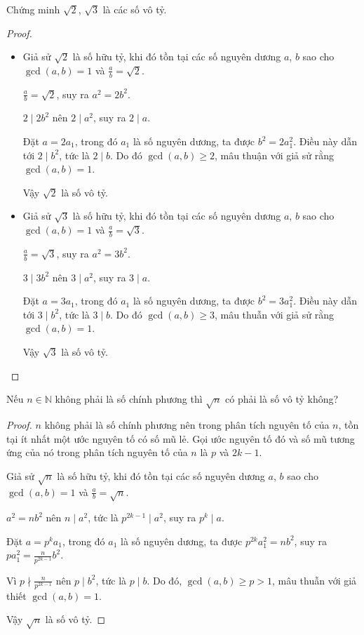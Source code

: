 \documentclass[class=analysis,crop=false]{standalone}
\begin{document}
\begin{exercise}
    Chứng minh $\sqrt{2}$, $\sqrt{3}$ là các số vô tỷ.
\end{exercise}

\begin{proof}
    \begin{itemize}
        \item Giả sử $\sqrt{2}$ là số hữu tỷ, khi đó tồn tại các số nguyên dương $a$, $b$ sao cho $\gcd(a,b) = 1$ và $\frac{a}{b} = \sqrt{2}$.
            \par $\frac{a}{b} = \sqrt{2}$, suy ra $a^{2} = 2b^{2}$.
            \par $2\mid 2b^{2}$ nên $2\mid a^{2}$, suy ra $2\mid a$.
            \par Đặt $a = 2a_{1}$, trong đó $a_{1}$ là số nguyên dương, ta được $b^{2} = 2a^{2}_{1}$. Điều này dẫn tới $2\mid b^{2}$, tức là $2\mid b$. Do đó $\gcd(a, b)\ge 2$, mâu thuận với giả sử rằng $\gcd(a, b) = 1$.
            \par Vậy $\sqrt{2}$ là số vô tỷ.
        \item Giả sử $\sqrt{3}$ là số hữu tỷ, khi đó tồn tại các số nguyên dương $a$, $b$ sao cho $\gcd(a,b) = 1$ và $\frac{a}{b} = \sqrt{3}$.
            \par $\frac{a}{b} = \sqrt{3}$, suy ra $a^{2} = 3b^{2}$.
            \par $3\mid 3b^{2}$ nên $3\mid a^{2}$, suy ra $3\mid a$.
            \par Đặt $a = 3a_{1}$, trong đó $a_{1}$ là số nguyên dương, ta được $b^{2} = 3a^{2}_{1}$. Điều này dẫn tới $3\mid b^{2}$, tức là $3\mid b$. Do đó $\gcd(a, b)\ge 3$, mâu thuẫn với giả sử rằng $\gcd(a, b) = 1$.
            \par Vậy $\sqrt{3}$ là số vô tỷ.
    \end{itemize}
\end{proof}

\begin{exercise}
    Nếu $n\in\mathbb{N}$ không phải là số chính phương thì $\sqrt{n}$ có phải là số vô tỷ không?
\end{exercise}

\begin{proof}
    $n$ không phải là số chính phương nên trong phân tích nguyên tố của $n$, tồn tại ít nhất một ước nguyên tố có số mũ lẻ. Gọi ước nguyên tố đó và số mũ tương ứng của nó trong phân tích nguyên tố của $n$ là $p$ và $2k - 1$.
    \bigskip
    \par Giả sử $\sqrt{n}$ là số hữu tỷ, khi đó tồn tại các số nguyên dương $a$, $b$ sao cho $\gcd(a,b) = 1$ và $\frac{a}{b} = \sqrt{n}$.
    \par $a^{2} = nb^{2}$ nên $n\mid a^{2}$, tức là $p^{2k-1}\mid a^{2}$, suy ra $p^{k}\mid a$.
    \par Đặt $a = p^{k}a_{1}$, trong đó $a_{1}$ là số nguyên dương, ta được $p^{2k}a^{2}_{1} = nb^{2}$, suy ra $pa^{2}_{1} = \frac{n}{p^{2k-1}}b^{2}$.
    \par Vì $p\nmid \frac{n}{p^{2k-1}}$ nên $p\mid b^{2}$, tức là $p\mid b$. Do đó, $\gcd(a,b)\ge p > 1$, mâu thuẫn với giả thiết $\gcd(a,b) = 1$.
    \par Vậy $\sqrt{n}$ là số vô tỷ.
\end{proof}
\end{document}

